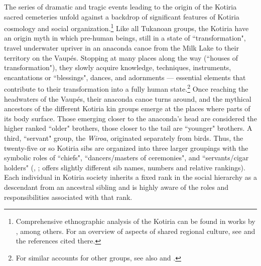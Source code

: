 \documentclass[output=paper,
modfonts,nonflat
]{langsci/langscibook}
\begin{document}
The series of dramatic and tragic events leading to the origin of the Kotiria sacred cemeteries unfold against a backdrop of significant features of Kotiria cosmology and social organization.\footnote{Comprehensive ethnographic analysis of the Kotiria can be found in works by \textcite{Chernela1983, Chernela1993, Chernela2004, Chernela2013}, among others. For an overview of aspects of shared regional culture, see \cite{Epps2013} and the references cited there.}   Like all Tukanoan groups, the Kotiria have an origin myth in which pre-human beings, still in a state of “transformation", travel underwater upriver in an anaconda canoe from the Milk Lake to their territory on the Vaupés. Stopping at many places along the way (“houses of transformation"), they slowly acquire knowledge, techniques, instruments, encantations or “blessings", dances, and adornments — essential elements that contribute to their transformation into a fully human state.\footnote{For similar accounts for other groups, see also \cite[165]{Cabalzar2008} and \cite{Andrello2012}.}  Once reaching the headwaters of the Vaupés, their anaconda canoe turns around, and the mythical ancestors of the different Kotiria kin groups emerge at the places where parts of its body surface. Those emerging closer to the anaconda’s head are considered the higher ranked “older" brothers, those closer to the tail are “younger" brothers. A third, “servant" group, the \textit{Wiroa}, originated separately from birds. Thus, the twenty-five or so Kotiria sibs are organized into three larger groupings with the symbolic roles of “chiefs", “dancers/masters of ceremonies", and “servants/cigar holders" (\citealt{Chernela1983}, \citealt[5-15, 51-59]{Chernela1993}; \citealt{Waltz1997} offers slightly different sib names, numbers and relative rankings). Each individual in Kotiria society inherits a fixed rank in the social hierarchy as a descendant from an ancestral sibling and is highly aware of the roles and responsibilities associated with that rank. 
\end{document}
